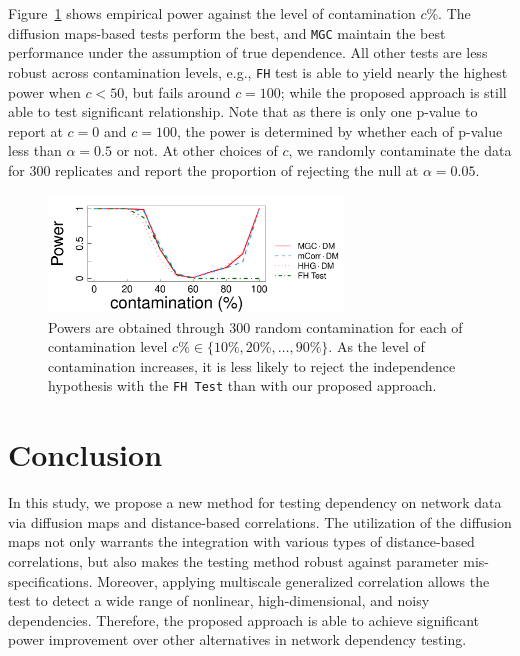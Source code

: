 \documentclass[12pt]{article}
\theoremstyle{definition}
\begin{document}
	Figure~\ref{fig:realexample} shows empirical power against the level of contamination $c \%$. The diffusion maps-based tests perform the best, and \texttt{MGC} maintain the best performance under the assumption of true dependence. All other tests are less robust across contamination levels, e.g., \texttt{FH} test is able to yield nearly the highest power when $c<50$, but fails around $c=100$; while the proposed approach is still able to test significant relationship. Note that as there is only one p-value to report at $c=0$ and $c=100$, the power is determined by whether each of p-value less than $\alpha = 0.5$ or not. At other choices of $c$, we randomly contaminate the data for $300$ replicates and report the proportion of rejecting the null at $\alpha = 0.05$.
	
	\begin{figure}[ht]
		\centering
		\includegraphics[width=0.7\textwidth]{../Figure/RealData_power.pdf}
		\caption{Powers are obtained through 300 random contamination for each of contamination level $c\% \in \{ 10\%, 20\%, \ldots, 90\% \}$. As the level of contamination increases, it is less likely to reject the independence hypothesis with the \texttt{FH Test} than with our proposed approach.}
		\label{fig:realexample}
	\end{figure}
	
	\section{Conclusion}
	\label{sec:conc}
	
	In this study, we propose a new method for testing dependency on network data via diffusion maps and distance-based correlations. The utilization of the diffusion maps not only warrants the integration with various types of distance-based correlations, but also makes the testing method robust against parameter mis-specifications. Moreover, applying multiscale generalized correlation allows the test to detect a wide range of nonlinear, high-dimensional, and noisy dependencies. Therefore, the proposed approach is able to achieve significant power improvement over other alternatives in network dependency testing. 
	
\end{document}
